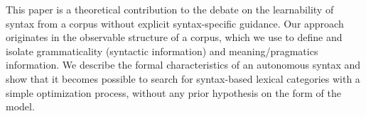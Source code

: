 This paper is a theoretical contribution to the debate on the learnability of syntax from a corpus without explicit syntax-specific guidance. Our approach originates in the observable structure of a corpus, which we use to define and isolate grammaticality (syntactic information) and meaning/pragmatics information. We describe the formal characteristics of an autonomous syntax and show that it becomes possible to search for syntax-based lexical categories with a simple optimization process, without any prior hypothesis on the form of the model.

